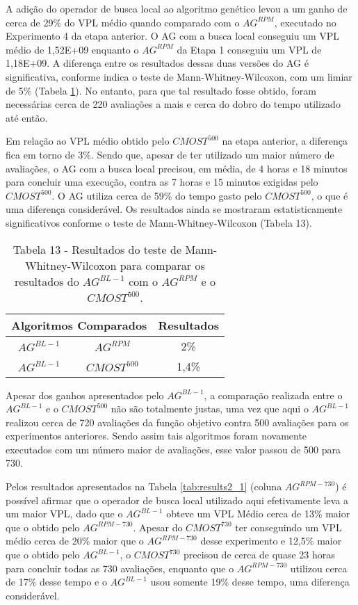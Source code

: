 A adição do operador de busca local ao algoritmo genético levou a um ganho de cerca de 29\% do VPL médio quando comparado com o $AG^{RPM}$, executado no Experimento 4 da etapa anterior. O AG com a busca local conseguiu um VPL médio de 1,52E+09 enquanto o $AG^{RPM}$ da Etapa 1 conseguiu um VPL de 1,18E+09. A diferença entre os resultados dessas duas versões do AG é significativa, conforme indica o teste de Mann-Whitney-Wilcoxon, com um limiar de 5\% (Tabela \ref{tab:mw6_1}). No entanto, para que tal resultado fosse obtido, foram necessárias cerca de 220 avaliações a mais e cerca do dobro do tempo utilizado até então.

Em relação ao VPL médio obtido pelo $CMOST^{500}$ na etapa anterior, a diferença fica em torno de 3\%. Sendo que, apesar de ter utilizado um maior número de avaliações, o AG com a busca local precisou, em média, de 4 horas e 18 minutos para concluir uma execução, contra as 7 horas e 15 minutos exigidas pelo $CMOST^{500}$. O AG utiliza cerca de 59\% do tempo gasto pelo $CMOST^{500}$, o que é uma diferença considerável. Os resultados ainda se mostraram estatisticamente significativos conforme o teste de Mann-Whitney-Wilcoxon  (Tabela 13).

\begin{table}[H]
\centering
\caption{Tabela 13 - Resultados do teste de Mann-Whitney-Wilcoxon para comparar os resultados do $AG^{BL-1}$ com o $AG^{RPM}$ e o $CMOST^{500}$.}
\label{tab:mw6_1}
\begin{tabular}{|c|c|c|}
\hline
\multicolumn{2}{|c|}{Algoritmos Comparados} & Resultados \\ \hline
$AG^{BL-1}$ & $AG^{RPM}$ & 2\% \\ \hline
$AG^{BL-1}$ & $CMOST^{500}$ & 1,4\% \\ \hline

\end{tabular}
\end{table}

Apesar dos ganhos apresentados pelo $AG^{BL-1}$, a comparação realizada entre o $AG^{BL-1}$ e o $CMOST^{500}$ não são totalmente justas, uma vez que aqui o $AG^{BL-1}$ realizou cerca de 720 avaliações da função objetivo contra 500 avaliações para os experimentos anteriores. Sendo assim tais algoritmos foram novamente executados com um número maior de avaliações, esse valor passou de 500 para 730. 

Pelos resultados apresentados na Tabela \ref{tab:results2_1} (coluna $AG^{RPM-730}$) é possível afirmar que o operador de busca local utilizado aqui efetivamente leva a um maior VPL, dado que o $AG^{BL-1}$ obteve um VPL Médio cerca de 13\% maior que o obtido pelo $AG^{RPM-730}$. Apesar do $CMOST^{730}$ ter conseguindo um VPL médio cerca de 20\% maior que o $AG^{RPM-730}$ desse experimento e 12,5\% maior que o obtido pelo $AG^{BL-1}$, o $CMOST^{730}$ precisou de cerca de quase 23 horas para concluir todas as 730 avaliações, enquanto que o $AG^{RPM-730}$ utilizou cerca de 17\% desse tempo e o $AG^{BL-1}$ usou somente 19\% desse tempo, uma diferença considerável.

